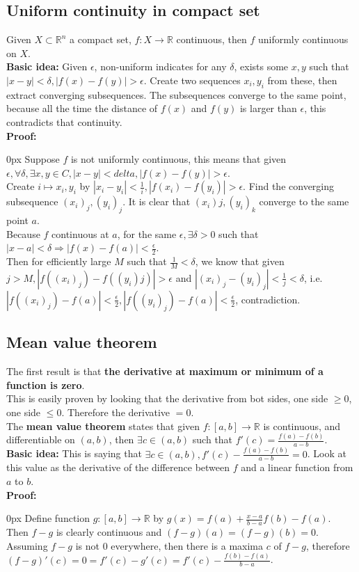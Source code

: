 \documentclass{article}
\begin{document}
\subsection{Uniform continuity in compact set}
Given $X \subset \mathbb{R}^n$ a compact set, $f:X \rightarrow \mathbb{R}$ continuous, then $f$ uniformly continuous on $X$.\\
\textbf{Basic idea:} Given $\epsilon$, non-uniform indicates for any $\delta$, exists some $x, y$ such that $|x-y| < \delta, |f(x) - f(y)| > \epsilon$. Create two sequences $x_i, y_i$ from these, then extract converging subsequences. The subsequences converge to the same point, because all the time the distance of $f(x)$ and $f(y)$ is larger than $\epsilon$, this contradicts that continuity.\\
\textbf{Proof:}
\begin{addmargin}[10px]{0px}
    Suppose $f$ is not uniformly continuous, this means that given $\epsilon, \forall \delta, \exists x, y \in C, |x-y| < delta, |f(x) - f(y)| > \epsilon$.\\
    Create $i \mapsto x_i, y_i$ by $|x_i - y_i| < \frac{1}{i}, |f(x_i) - f(y_i)| > \epsilon$. Find the converging subsequence $(x_i)_j, (y_i)_j$. It is clear that $(x_i)j, (y_i)_k$ converge to the same point $a$.\\
    Because $f$ continuous at $a$, for the same $\epsilon, \exists \delta > 0$ such that $|x - a| < \delta \Rightarrow |f(x) - f(a)| < \frac{\epsilon}{2}$.\\
    Then for efficiently large $M$ such that $\frac{1}{M} < \delta$, we know that given $j > M, |f((x_i)_j) - f((y_i)j)| > \epsilon$ and $|(x_i)_j - (y_i)_j| < \frac{1}{j} < \delta$, i.e. $|f((x_i)_j) - f(a)| < \frac{\epsilon}{2}, |f((y_i)_j) - f(a)| < \frac{\epsilon}{2}$, contradiction.
\end{addmargin}
\subsection{Mean value theorem}
The first result is that \textbf{the derivative at maximum or minimum of a function is zero}.\\
This is easily proven by looking that the derivative from bot sides, one side $\geq 0$, one side $\leq 0$. Therefore the derivative $=0$.\\
The \textbf{mean value theorem} states that given $f:[a, b] \rightarrow \mathbb{R}$ is continuous, and differentiable on $(a, b)$, then $\exists c \in (a, b)$ such that $f'(c) = \frac{f(a)-f(b)}{a-b}$.\\
\textbf{Basic idea:} This is saying that $\exists c \in (a, b), f'(c) - \frac{f(a) - f(b)}{a-b} = 0$. Look at this value as the derivative of the difference between $f$ and a linear function from $a$ to $b$.\\
\textbf{Proof:}
\begin{addmargin}[10px]{0px}
    Define function $g:[a, b] \rightarrow \mathbb{R}$ by $g(x) = f(a) + \frac{x-a}{b-a} f(b)-f(a)$.\\
    Then $f-g$ is clearly continuous and $(f-g)(a) = (f-g)(b) = 0$. Assuming $f-g$ is not $0$ everywhere, then there is a maxima $c$ of $f-g$, therefore $(f-g)'(c) = 0 = f'(c) - g'(c) = f'(c) - \frac{f(b) - f(a)}{b-a}$.
\end{addmargin}
\end{document}
